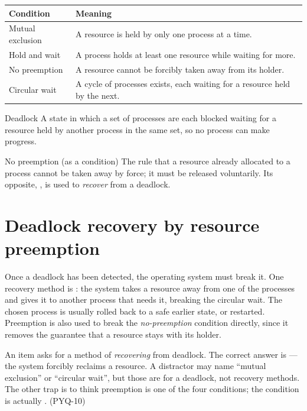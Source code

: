 \begin{center}
\begin{tabular}{p{}p{}}
\toprule
\textbf{Condition} & \textbf{Meaning} \\
\midrule
Mutual exclusion & A resource is held by only one process at a time. \\
Hold and wait & A process holds at least one resource while waiting for more. \\
No preemption & A resource cannot be forcibly taken away from its holder. \\
Circular wait & A cycle of processes exists, each waiting for a resource held by the next. \\
\bottomrule
\end{tabular}
\end{center}

\begin{definitionbox}{Deadlock}
A state in which a set of processes are each blocked waiting for a resource
held by another process in the same set, so no process can make progress.
\end{definitionbox}

\begin{definitionbox}{No preemption (as a condition)}
The rule that a resource already allocated to a process cannot be taken away
by force; it must be released voluntarily. Its opposite, , is
used to \emph{recover} from a deadlock.
\end{definitionbox}

\section{Deadlock recovery by resource preemption}
Once a deadlock has been detected, the operating system must break it. One
recovery method is : the system takes a resource away
from one of the processes and gives it to another process that needs it,
breaking the circular wait. The chosen process is usually rolled back to a
safe earlier state, or restarted. Preemption is also used to break the
\emph{no-preemption} condition directly, since it removes the guarantee that a
resource stays with its holder.

\begin{example}
An item asks for a method of \emph{recovering} from deadlock. The correct
answer is  --- the system forcibly reclaims a
resource. A distractor may name ``mutual exclusion'' or ``circular wait'',
but those are  for a deadlock, not recovery
methods. The other trap is to think preemption is one of the four conditions;
the condition is actually . (PYQ-10)
\end{example}

